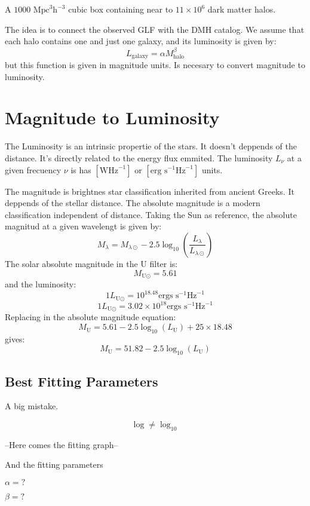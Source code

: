 \documentclass[manuscript]{aastex}
\begin{document}
A $1000 \textrm{ Mpc} ^3 \textrm{h}^{−3}$ cubic box containing near to $11\times10^6$ dark matter halos.

The idea is to connect the observed GLF with the DMH catalog. We assume that each halo contains one and just one galaxy, and its luminosity is given by:
\begin{equation}
L_\textrm{galaxy}=\alpha M_\textrm{halo}^\beta 
\end{equation}
but this function is given in magnitude units. Is necesary to convert magnitude to luminosity.

\section{Magnitude to Luminosity}
The Luminosity is an intrinsic propertie of the stars. It doesn't deppends of the distance. 
It's directly related to the energy flux emmited. The luminosity $L_\nu$ at a given frecuency 
$\nu$ is has $[\textrm{W}\textrm{Hz}^{-1}]$ or $[\textrm{erg }\textrm{s}^{-1}\textrm{Hz}^{-1}]$ units.

The magnitude is brightnes star classification inherited from ancient Greeks. It deppends of 
the stellar distance. The absolute magnitude is a modern classification independent of 
distance. Taking the Sun as reference, the absolute magnitud at a given wavelengt is given by: 
\[ M_{\lambda} = M_{\lambda \odot} - 2.5 \log_{10}\left( \frac{L_\lambda}{L_{\lambda \odot}} \right) \]
The solar absolute magnitude in the U filter is:
\[ M_{\textrm{U} \odot} = 5.61\]
and the luminosity:
\[ 1 L_{\textrm{U} \odot} = 10^{18.48} \textrm{ergs s}^{-1}\textrm{Hz}^{-1}\]
\[ 1 L_{\textrm{U} \odot} = 3.02 \times 10^{18} \textrm{ergs s}^{-1}\textrm{Hz}^{-1}\]
Replacing in the absolute magnitude equation:
\[ M_{\textrm{U}} = 5.61 - 2.5 \log_{10}(L_{\textrm{U}}) + 25\times18.48\]
gives:
\[ M_{\textrm{U}} = 51.82 - 2.5 \log_{10}(L_{\textrm{U}}) \]

\subsection{Best Fitting Parameters}

\huge
A big mistake.

\[\log \neq \log_{10}\]
\normalsize

--Here comes the fitting graph--

And the fitting parameters

$\alpha = ?$

$\beta = ?$
\end{document}
